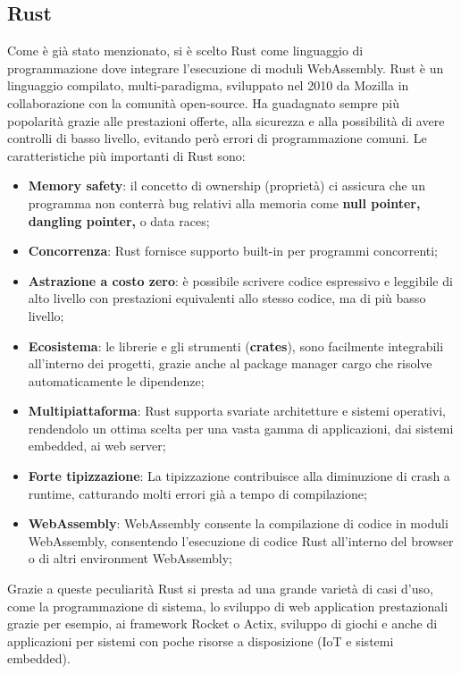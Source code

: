 \subsection{Rust}
Come è già stato menzionato, si è scelto Rust come linguaggio di programmazione dove integrare l'esecuzione di moduli WebAssembly.
Rust è un linguaggio compilato, multi-paradigma, sviluppato nel 2010 da Mozilla in collaborazione con la comunità open-source.\cite*{rust}
Ha guadagnato sempre più popolarità grazie alle prestazioni offerte, alla sicurezza e alla possibilità di avere controlli di basso livello, evitando però errori di programmazione comuni.
Le caratteristiche più importanti di Rust sono:
\begin{itemize}
        \item \textbf{Memory safety}: il concetto di ownership (proprietà) ci assicura che un programma non conterrà bug relativi alla memoria come \textbf{null pointer, dangling pointer, } o data races;
        \item \textbf{Concorrenza}: Rust fornisce supporto built-in per programmi concorrenti;
        \item \textbf{Astrazione a costo zero}: è possibile scrivere codice espressivo e leggibile di alto livello con prestazioni equivalenti allo stesso codice, ma di più basso livello;
        \item \textbf{Ecosistema}: le librerie e gli strumenti (\textbf{crates}), sono facilmente integrabili all'interno dei progetti, grazie anche al package manager cargo che risolve automaticamente le dipendenze;
        \item \textbf{Multipiattaforma}: Rust supporta svariate architetture e sistemi operativi, rendendolo un ottima scelta per una vasta gamma di applicazioni, dai sistemi embedded, ai web server;
        \item \textbf{Forte tipizzazione}: La tipizzazione contribuisce alla diminuzione di crash a runtime, catturando molti errori già a tempo di compilazione;
        \item \textbf{WebAssembly}: WebAssembly consente la compilazione di codice in moduli WebAssembly, consentendo l'esecuzione di codice Rust all'interno del browser o di altri environment WebAssembly;
\end{itemize}
Grazie a queste peculiarità Rust si presta ad una grande varietà di casi d'uso, come la programmazione di sistema, lo sviluppo di web application prestazionali grazie per esempio, ai framework Rocket o Actix, sviluppo di giochi e anche di applicazioni per sistemi con poche risorse a disposizione (IoT e sistemi embedded).
\newpage

